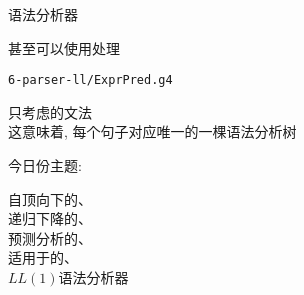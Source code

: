 
\begin{frame}{}
  \begin{center}
    语法分析器

    \vspace{0.50cm}
    \vspace{0.50cm}

    甚至可以使用处理
  \end{center}
\end{frame}

\begin{frame}{}

  \begin{center}
    \texttt{6-parser-ll/ExprPred.g4}
  \end{center}
\end{frame}

\begin{frame}{}
  \begin{center}
    只考虑的文法 \\[4pt]
    这意味着, 每个句子对应唯一的一棵语法分析树


    今日份主题: 
  \end{center}
\end{frame}

\begin{frame}{}
  \begin{center}
    自顶向下的、\\[15pt]
    递归下降的、\\[15pt]
    预测分析的、\\[15pt]
    适用于的、\\[15pt]
    $LL(1)$语法分析器
  \end{center}
\end{frame}

